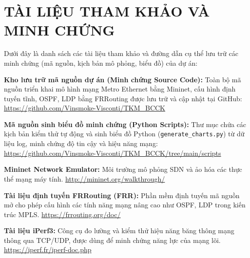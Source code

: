 \section*{TÀI LIỆU THAM KHẢO VÀ MINH CHỨNG}

Dưới đây là danh sách các tài liệu tham khảo và đường dẫn cụ thể lưu trữ các minh chứng (mã nguồn, kịch bản mô phỏng, biểu đồ) của dự án:

\begin{enumerate}[label={[\arabic*]}]
    \item \textbf{Kho lưu trữ mã nguồn dự án (Minh chứng Source Code):} Toàn bộ mã nguồn triển khai mô hình mạng Metro Ethernet bằng Mininet, cấu hình định tuyến tĩnh, OSPF, LDP bằng FRRouting được lưu trữ và cập nhật tại GitHub:
    \newline \url{https://github.com/Vinsmoke-Visconti/TKM_BCCK}

    \item \textbf{Mã nguồn sinh biểu đồ minh chứng (Python Scripts):} Thư mục chứa các kịch bản kiểm thử tự động và sinh biểu đồ Python (\texttt{generate\_charts.py}) từ dữ liệu log, minh chứng độ tin cậy và hiệu năng mạng:
    \newline \url{https://github.com/Vinsmoke-Visconti/TKM_BCCK/tree/main/scripts}

    \item \textbf{Mininet Network Emulator:} Môi trường mô phỏng SDN và ảo hóa các thực thể mạng máy tính.
    \newline \url{http://mininet.org/walkthrough/}
    
    \item \textbf{Tài liệu định tuyến FRRouting (FRR):} Phần mềm định tuyến mã nguồn mở cho phép cấu hình các tính năng mạng nâng cao như OSPF, LDP trong kiến trúc MPLS.
    \newline \url{https://frrouting.org/doc/}

    \item \textbf{Tài liệu iPerf3:} Công cụ đo lường và kiểm thử hiệu năng băng thông mạng thông qua TCP/UDP, được dùng để minh chứng năng lực của mạng lõi.
    \newline \url{https://iperf.fr/iperf-doc.php}
\end{enumerate}
